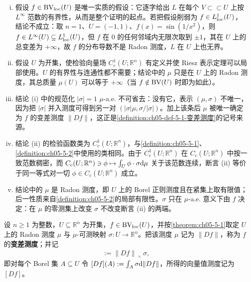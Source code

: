 \documentclass[../../main.tex]{subfiles}%
\begin{document}
\begin{remark}\label{remark:ch05-thm-5-1-条件}
\begin{enumerate}[(i)]
\item 假设 $f\in\mathrm{BV}_{\mathrm{loc}}(U)$ 是唯一实质的假设：它逐字给出 $L$ 在每个 $V\subset\subset U$ 上按 $L^{\infty}$ 范数的有界性，从而是整个证明的起点。若把假设削弱为 $f\in L^1_{\mathrm{loc}}(U)$，结论不成立：取 $n=1$、$U=(-1,1)$、$f(x)=\sin(1/x^2)$，则 $f\in L^{\infty}(U)\subseteq L^1_{\mathrm{loc}}(U)$，但 $f$ 在 $0$ 的任何邻域内无限次取到 $\pm1$，其在 $U$ 上的总变差为 $+\infty$，故 $f$ 的分布导数不是 Radon 测度，$L$ 在 $U$ 上也无界。
\item 假设 $U$ 为开集，使检验向量场 $C_c^1(U;\mathbb{R}^n)$ 有定义并使 Riesz 表示定理可以局部使用。$U$ 的有界性与连通性都不需要；结论中的 $\mu$ 只是在 $U$ 上的 Radon 测度，其总质量 $\mu(U)$ 可以等于 $+\infty$（当 $f\notin\mathrm{BV}(U)$ 时即为如此）。
\item 结论 (i) 中的规范化 $\lvert\sigma\rvert=1$ $\mu$-a.e. 不可省去：没有它，表示 $(\mu,\sigma)$ 不唯一，因为把 $\lvert\sigma\rvert$ 并入测度可得到另一对 $(\lvert\sigma\rvert\mu,\sigma/\lvert\sigma\rvert)$。加上该条后 $\mu$ 被唯一确定为 $f$ 的变差测度 $\lVert Df\rVert$，这正是\cref{definition:ch05-def-5-1-变差测度}的记号来源。%
\item 结论 (ii) 的检验函数类为 $C_c^1(U;\mathbb{R}^n)$，与\cref{definition:ch05-5-1}、\cref{definition:ch05-5-2}中使用的类相同。由于 $C_c^1(U;\mathbb{R}^n)$ 在 $C_c(U;\mathbb{R}^n)$ 中按一致范数稠密，而 $C_c(U;\mathbb{R}^n)\ni\phi\mapsto\int_U\phi\cdot\sigma\mathrm{d}\mu$ 关于该范数连续，断言 (ii) 等价于同一等式对一切 $\phi\in C_c(U;\mathbb{R}^n)$ 成立。%
\item 结论中的 $\mu$ 是 Radon 测度，即 $U$ 上的 Borel 正则测度且在紧集上取有限值；后一性质来自\cref{definition:ch05-5-2}的局部有限性。$\sigma$ 只在 $\mu$-a.e. 意义下由 $f$ 决定：在 $\mu$ 的零测集上改变 $\sigma$ 不改变断言 (ii) 的两端。 %
\end{enumerate}
\end{remark}

\begin{definition*}[变差测度的记号]\label{definition:ch05-def-5-1-变差测度}
设 $n\geqslant1$ 为整数，$U\subseteq\mathbb{R}^n$ 为开集，$f\in\mathrm{BV}_{\mathrm{loc}}(U)$，并按\cref{theorem:ch05-5-1}取定 $U$ 上的 Radon 测度 $\mu$ 与 $\mu$-可测映射 $\sigma:U\to\mathbb{R}^n$。把该测度 $\mu$ 记为 $\lVert Df\rVert$，称为 $f$ 的\textbf{变差测度}；并记 %
\begin{align*}
[Df]:=\lVert Df\rVert\llcorner\sigma,
\end{align*}
即对每个 Borel 集 $A\subseteq U$ 令 $[Df](A):=\int_A\sigma\mathrm{d}\lVert Df\rVert$，所得的向量值测度记为 $[Df]$。
\end{definition*}
\end{document}
